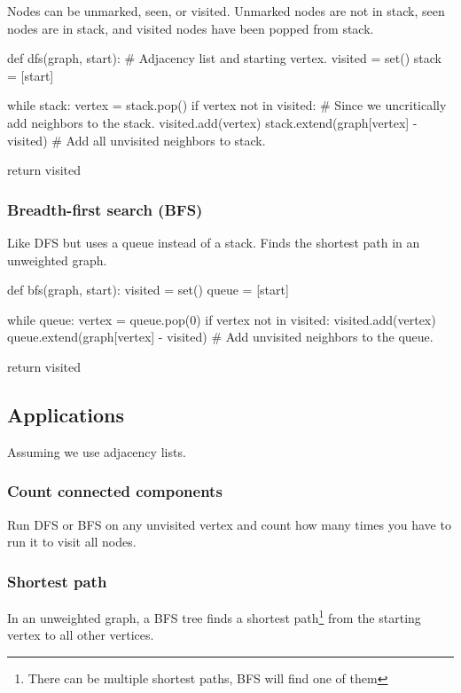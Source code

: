 Nodes can be unmarked, seen, or visited. Unmarked nodes are not in stack, seen nodes are in stack, and visited nodes have been popped from stack.

\begin{python}
def dfs(graph, start): # Adjacency list and starting vertex.
    visited = set()
    stack = [start]

    while stack:
        vertex = stack.pop()
        if vertex not in visited: # Since we uncritically add neighbors to the stack.
            visited.add(vertex)
            stack.extend(graph[vertex] - visited) # Add all unvisited neighbors to stack.

    return visited
\end{python}


\subsubsection{Breadth-first search (BFS)}
Like DFS but uses a queue instead of a stack. Finds the shortest path in an unweighted graph.

\begin{python}
def bfs(graph, start):
    visited = set()
    queue = [start]

    while queue:
        vertex = queue.pop(0)
        if vertex not in visited:
            visited.add(vertex)
            queue.extend(graph[vertex] - visited) # Add unvisited neighbors to the queue.

    return visited
\end{python}


\subsection{Applications}
Assuming we use adjacency lists.
\subsubsection{Count connected components}
Run DFS or BFS on any unvisited vertex and count how many times you have to run it to visit all nodes.


\subsubsection{Shortest path}
In an unweighted graph, a BFS tree finds a shortest path\footnote{There can be multiple shortest paths, BFS will find one of them}
from the starting vertex to all other vertices.

